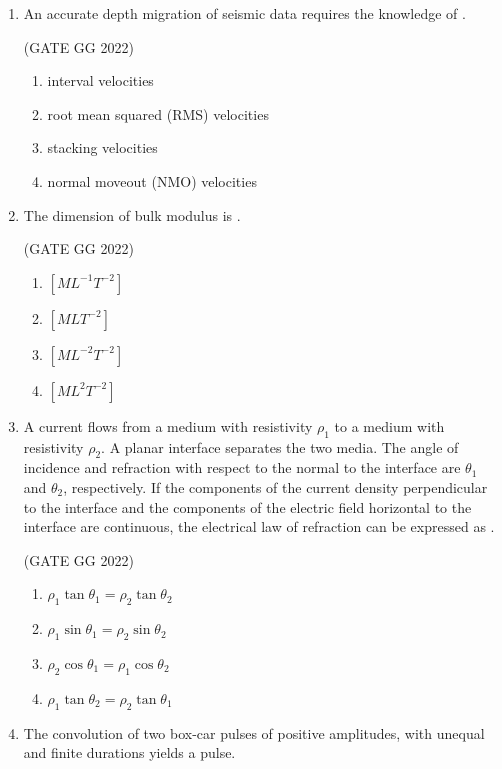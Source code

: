 \documentclass[journal]{IEEEtran}
\begin{document}
\begin{enumerate}
\item An accurate depth migration of seismic data requires the knowledge of \makebox[2cm]{\hrulefill} .

\hfill(GATE GG 2022)
\begin{enumerate}
\item interval velocities  
\item root mean squared (RMS) velocities  
\item stacking velocities  
\item normal moveout (NMO) velocities  
\end{enumerate}

\item The dimension of bulk modulus is  \makebox[2cm]{\hrulefill} .

\hfill(GATE GG 2022)
\begin{enumerate}
\item $[M L^{-1} T^{-2}]$  
\item $[M L T^{-2}]$  
\item $[M L^{-2} T^{-2}]$  
\item $[M L^{2} T^{-2}]$  
\end{enumerate}

\item A current flows from a medium with resistivity $\rho_1$ to a medium with resistivity $\rho_2$. A planar interface separates the two media. The angle of incidence and refraction with respect to the normal to the interface are $\theta_1$ and $\theta_2$, respectively. If the components of the current density perpendicular to the interface and the components of the electric field horizontal to the interface are continuous, the electrical law of refraction can be expressed as \makebox[2cm]{\hrulefill} .

\hfill(GATE GG 2022)
\begin{enumerate}
\item $\rho_1 \tan \theta_1 = \rho_2 \tan \theta_2$  
\item $\rho_1 \sin \theta_1 = \rho_2 \sin \theta_2$  
\item $\rho_2 \cos \theta_1 = \rho_1 \cos \theta_2$  
\item $\rho_1 \tan \theta_2 = \rho_2 \tan \theta_1$  
\end{enumerate}

\item The convolution of two box-car pulses of positive amplitudes, with unequal and finite durations yields a \makebox[2cm]{\hrulefill}pulse.  


\end{enumerate}
\end{document}
